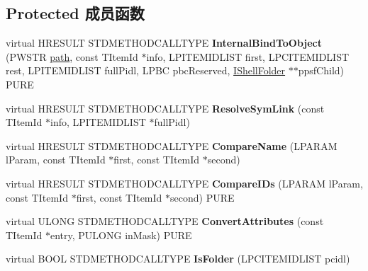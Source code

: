 \subsection*{Protected 成员函数}
\begin{DoxyCompactItemize}
\item 
\mbox{\label{class_c_common_folder_abc85aa88885d8375952c0bf89cc50133}} 
virtual H\+R\+E\+S\+U\+LT S\+T\+D\+M\+E\+T\+H\+O\+D\+C\+A\+L\+L\+T\+Y\+PE {\bfseries Internal\+Bind\+To\+Object} (P\+W\+S\+TR \hyperlink{structpath}{path}, const T\+Item\+Id $\ast$info, L\+P\+I\+T\+E\+M\+I\+D\+L\+I\+ST first, L\+P\+C\+I\+T\+E\+M\+I\+D\+L\+I\+ST rest, L\+P\+I\+T\+E\+M\+I\+D\+L\+I\+ST full\+Pidl, L\+P\+BC pbc\+Reserved, \hyperlink{interface_i_shell_folder}{I\+Shell\+Folder} $\ast$$\ast$ppsf\+Child) P\+U\+RE
\item 
\mbox{\label{class_c_common_folder_a308fd531e72f24c4a34aa0d07bbb4880}} 
virtual H\+R\+E\+S\+U\+LT S\+T\+D\+M\+E\+T\+H\+O\+D\+C\+A\+L\+L\+T\+Y\+PE {\bfseries Resolve\+Sym\+Link} (const T\+Item\+Id $\ast$info, L\+P\+I\+T\+E\+M\+I\+D\+L\+I\+ST $\ast$full\+Pidl)
\item 
\mbox{\label{class_c_common_folder_a04aca6409923c7506653d4317659a514}} 
virtual H\+R\+E\+S\+U\+LT S\+T\+D\+M\+E\+T\+H\+O\+D\+C\+A\+L\+L\+T\+Y\+PE {\bfseries Compare\+Name} (L\+P\+A\+R\+AM l\+Param, const T\+Item\+Id $\ast$first, const T\+Item\+Id $\ast$second)
\item 
\mbox{\label{class_c_common_folder_a8e03c0ad8c1410cdca95d89b600ef001}} 
virtual H\+R\+E\+S\+U\+LT S\+T\+D\+M\+E\+T\+H\+O\+D\+C\+A\+L\+L\+T\+Y\+PE {\bfseries Compare\+I\+Ds} (L\+P\+A\+R\+AM l\+Param, const T\+Item\+Id $\ast$first, const T\+Item\+Id $\ast$second) P\+U\+RE
\item 
\mbox{\label{class_c_common_folder_a674820beb1b0e9738e61f12bb8bb34d0}} 
virtual U\+L\+O\+NG S\+T\+D\+M\+E\+T\+H\+O\+D\+C\+A\+L\+L\+T\+Y\+PE {\bfseries Convert\+Attributes} (const T\+Item\+Id $\ast$entry, P\+U\+L\+O\+NG in\+Mask) P\+U\+RE
\item 
\mbox{\label{class_c_common_folder_a5afa924b6c76017586ee7db0619bbac4}} 
virtual B\+O\+OL S\+T\+D\+M\+E\+T\+H\+O\+D\+C\+A\+L\+L\+T\+Y\+PE {\bfseries Is\+Folder} (L\+P\+C\+I\+T\+E\+M\+I\+D\+L\+I\+ST pcidl)
$$
\end{DoxyCompactItemize}
